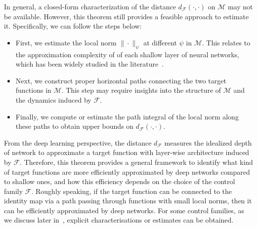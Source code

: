 \documentclass[12pt]{amsart}
\numberwithin{equation}{section}
\theoremstyle{remark}
\begin{document}
In general, a closed-form characterization of the distance $d_{\mathcal F}(\cdot, \cdot)$ on $\mathcal M$ may not be available. However, this theorem still provides a feasible approach to estimate it. Specifically, we can follow the steps below:
\begin{itemize}
    \item First, we estimate the local norm $\|\cdot\|_{\psi}$ at different $\psi$ in $\mathcal M$.
    This relates to the approximation complexity of of each shallow layer of neural networks,
    which has been widely studied in the literature~\cite{ma2022barron,siegel2020approximation,siegel2023characterization}.
    \item Next, we construct proper horizontal paths connecting the two target functions in $\mathcal M$. This step may require insights into the structure of $\mathcal M$ and the dynamics induced by $\mathcal F$.
    \item Finally, we compute or estimate the path integral of the local norm along these paths to obtain upper bounds on $d_{\mathcal F}(\cdot, \cdot)$.
\end{itemize}
From the deep learning perspective, the distance $d_{\mathcal F}$ measures the idealized depth of network to approximate a target function with layer-wise architecture induced by $\mathcal F$. Therefore, this theorem provides a general framework to identify what kind of target functions are more efficiently approximated by deep networks compared to shallow ones, and how this efficiency depends on the choice of the control family $\mathcal F$.  Roughly speaking, if the target function can be connected to the identity map via a path passing through functions with small local norms, then it can be efficiently approximated by deep networks.
For some control families, as we discuss later in~, explicit characterisations or estimates can be obtained.
\end{document}
